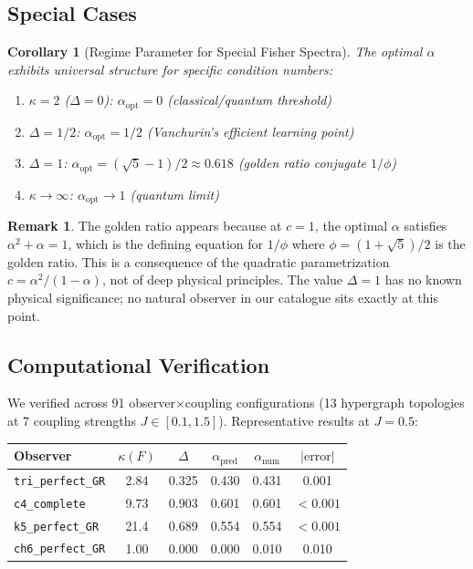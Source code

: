 \documentclass[11pt,a4paper]{article}
\theoremstyle{plain}
\newtheorem{corollary}[theorem]{Corollary}
\theoremstyle{definition}
\newtheorem{remark}[theorem]{Remark}
\theoremstyle{remark}
\begin{document}
\subsection{Special Cases}

\begin{corollary}[Regime Parameter for Special Fisher Spectra]
\label{cor:special_cases}
The optimal $\alpha$ exhibits universal structure for specific condition numbers:
\begin{enumerate}[noitemsep]
\item $\kappa = 2$ ($\Delta = 0$): $\alpha_{\mathrm{opt}} = 0$ (classical/quantum threshold)
\item $\Delta = 1/2$: $\alpha_{\mathrm{opt}} = 1/2$ (Vanchurin's efficient learning point)
\item $\Delta = 1$: $\alpha_{\mathrm{opt}} = (\sqrt{5}-1)/2 \approx 0.618$ (golden ratio conjugate $1/\phi$)
\item $\kappa \to \infty$: $\alpha_{\mathrm{opt}} \to 1$ (quantum limit)
\end{enumerate}
\end{corollary}

\begin{remark}
The golden ratio appears because at $c = 1$, the optimal $\alpha$ satisfies $\alpha^2 + \alpha = 1$, which is the defining equation for $1/\phi$ where $\phi = (1+\sqrt{5})/2$ is the golden ratio. This is a consequence of the quadratic parametrization $c = \alpha^2/(1-\alpha)$, not of deep physical principles. The value $\Delta = 1$ has no known physical significance; no natural observer in our catalogue sits exactly at this point.
\end{remark}

\subsection{Computational Verification}

We verified  across 91 observer$\times$coupling configurations (13 hypergraph topologies at 7 coupling strengths $J \in [0.1, 1.5]$). Representative results at $J = 0.5$:

\begin{center}
\begin{tabular}{lccccc}
\hline
\textbf{Observer} & $\kappa(F)$ & $\Delta$ & $\alpha_{\text{pred}}$ & $\alpha_{\text{num}}$ & $|\text{error}|$ \\
\hline
\texttt{tri\_perfect\_GR} & 2.84 & 0.325 & 0.430 & 0.431 & 0.001 \\
\texttt{c4\_complete} & 9.73 & 0.903 & 0.601 & 0.601 & $<0.001$ \\
\texttt{k5\_perfect\_GR} & 21.4 & 0.689 & 0.554 & 0.554 & $<0.001$ \\
\texttt{ch6\_perfect\_GR} & 1.00 & 0.000 & 0.000 & 0.010 & 0.010 \\
\hline
\end{tabular}
\end{center}
\end{document}
